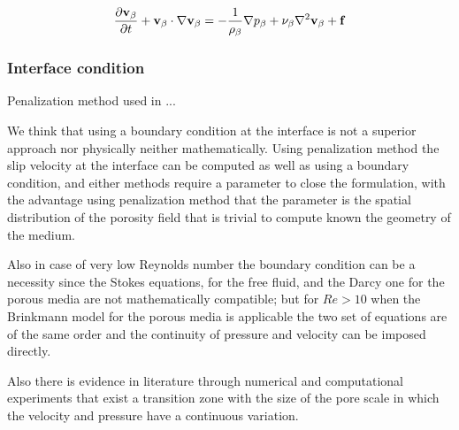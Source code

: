 \begin{equation}
\dfrac{\partial \textbf{v}_{\beta}}{\partial t} + \textbf{v}_{\beta} \cdot \nabla \textbf{v}_{\beta} = -\frac{1}{\rho_{\beta}} \nabla p_{\beta} + \nu_{\beta} \nabla^2  \textbf{v}_{\beta}  + \mathbf{f}
\label{eq:mom}
\end{equation}



\subsubsection{Interface condition}

Penalization method \citet{angot1999penalization} used in\cite{bruneau2004passive} \cite{bruneau2008numerical} \cite{bruneau2010coupling}...


We think that using a boundary condition at the interface is not a superior approach nor physically neither mathematically.
Using penalization method the slip velocity at the interface can be computed as well as using a boundary condition, and either methods require a parameter to close the formulation, with the advantage using penalization method that the parameter is the spatial distribution of the porosity field that is trivial to compute known the geometry of the medium.

Also in case of very low Reynolds number the boundary condition can be a necessity since the Stokes equations, for the free fluid, and the Darcy one for the porous media are not mathematically compatible; but for $Re>10$ when the Brinkmann model for the porous media is applicable the two set of equations are of the same order and the continuity of pressure and velocity can be imposed directly.

Also there is evidence in literature through numerical and computational experiments \citet{ochoa2017fluid} that exist a transition zone with the size of the pore scale in which the velocity and pressure have a continuous variation.
